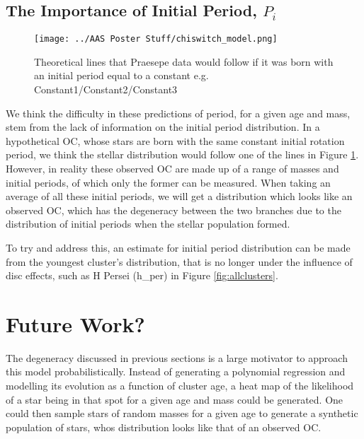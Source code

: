 \documentclass[fleqn,usenatbib]{mnras}
\begin{document}
{\subsection{The Importance of Initial Period, $P_i$} \label{sec:initial_period}
\begin{figure}
	\texttt{[image: ../AAS Poster Stuff/chiswitch\_model.png]}
	\caption{Theoretical lines that Praesepe data would follow if it was born with an initial period equal to a constant e.g. Constant1/Constant2/Constant3}
	\label{fig:spread_initial_period}
\end{figure}
We think the difficulty in these predictions of period, for a given age and mass, stem from the lack of information on the initial period distribution.
In a hypothetical OC, whose stars are born with the same constant initial rotation period, we think the stellar distribution would follow one of the lines in Figure \ref{fig:spread_initial_period}.
However, in reality these observed OC are made up of a range of masses and initial periods, of which only the former can be measured.
When taking an average of all these initial periods, we will get a distribution which looks like an observed OC, which has the degeneracy between the two branches due to the distribution of initial periods when the stellar population formed.

To try and address this, an estimate for initial period distribution can be made from the youngest cluster's distribution, that is no longer under the influence of disc effects, such as H Persei (h\_per) in Figure \ref{fig:allclusters}.

\section{Future Work?}
The degeneracy discussed in previous sections is a large motivator to approach this model probabilistically.
Instead of generating a polynomial regression and modelling its evolution as a function of cluster age, a heat map of the likelihood of a star being in that spot for a given age and mass could be generated.
One could then sample stars of random masses for a given age to generate a synthetic population of stars, whos distribution looks like that of an observed OC.

}
\end{document}
